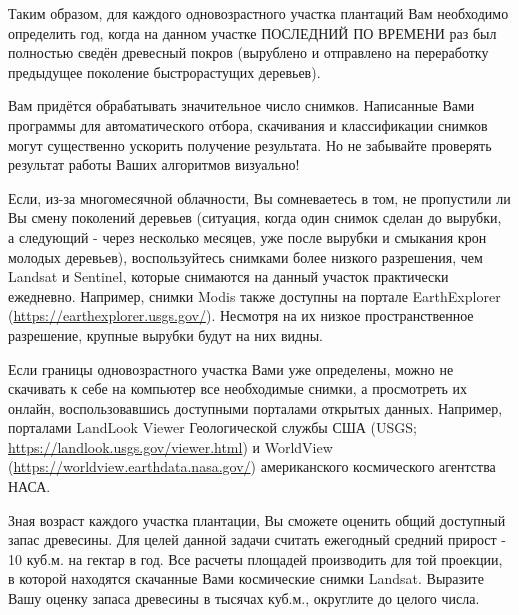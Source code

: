 Таким образом, для каждого одновозрастного участка плантаций Вам необходимо определить год, когда на данном участке ПОСЛЕДНИЙ ПО ВРЕМЕНИ раз был полностью сведён древесный покров (вырублено и отправлено на переработку предыдущее поколение быстрорастущих деревьев). 

Вам придётся обрабатывать значительное число снимков. Написанные Вами программы для автоматического отбора, скачивания и классификации снимков могут существенно ускорить получение результата. Но не забывайте проверять результат работы Ваших алгоритмов визуально!

Если, из-за многомесячной облачности, Вы сомневаетесь в том, не пропустили ли Вы смену поколений деревьев 
(ситуация, когда один снимок сделан до вырубки, а следующий - через несколько месяцев, уже после 
вырубки и смыкания крон молодых деревьев), воспользуйтесь снимками более низкого разрешения, чем Landsat и 
Sentinel, которые снимаются на данный участок практически ежедневно. Например, 
снимки Modis также доступны на портале EarthExplorer (\url{https://earthexplorer.usgs.gov/}). Несмотря на их низкое пространственное разрешение, крупные вырубки будут на них видны.

Если границы одновозрастного участка Вами уже определены, можно не скачивать к себе на компьютер все 
необходимые снимки, а просмотреть их онлайн, воспользовавшись доступными порталами открытых данных. 
Например, порталами LandLook Viewer Геологической службы США (USGS; \url{https://landlook.usgs.gov/viewer.html}) и WorldView (\url{https://worldview.earthdata.nasa.gov/}) американского космического агентства НАСА.

Зная возраст каждого участка плантации, Вы сможете оценить общий доступный запас древесины. Для целей данной задачи считать ежегодный средний прирост - 10 куб.м. на гектар в год. Все расчеты площадей производить для той проекции, в которой находятся скачанные Вами космические снимки Landsat. Выразите Вашу оценку запаса древесины в тысячах куб.м., округлите до целого числа.